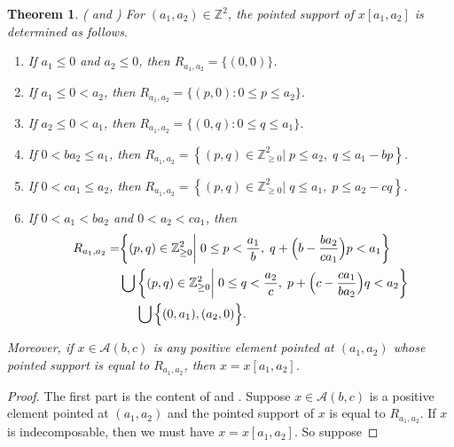 \documentclass[11pt]{amsart}
\newtheorem{theorem}{Theorem}[section]
\theoremstyle{remark}
\numberwithin{equation}{section}
\newcommand{\ZZ}{\mathbb{Z}}
\newcommand{\cA}{\mathcal{A}}
\begin{document}
\begin{theorem}\label{th:pointed supports}(\cite[Proposition~4.1]{LLZ} and \cite[Corollary 3.5]{LLZ2})
  For $(a_1,a_2)\in\ZZ^2$, the pointed support of $x[a_1,a_2]$ is determined as follows.
\begin{enumerate}
  \item If $a_1 \leq 0$ and $a_2 \leq 0$, then $R_{a_1,a_2} = \{(0,0)\}$.
  \item If $a_1 \leq 0 < a_2$, then $R_{a_1,a_2} = \{(p,0): 0 \leq p \leq a_2\}$.
  \item If $a_2 \leq 0 < a_1$, then $R_{a_1,a_2} = \{(0,q): 0 \leq q \leq a_1\}$.
  \item If $0<ba_2\leq a_1$, then $R_{a_1,a_2}=\left\{(p,q)\in\ZZ_{\ge0}^2\big|\; p\le a_{2},\; q\le a_{1}-bp\right\}$.
  \item If $0<ca_1\leq a_2$, then $R_{a_1,a_2}=\left\{(p,q)\in\ZZ_{\ge0}^2\big|\; q\le a_{1},\; p\le a_{2}-cq\right\}$.
  \item If $0 < a_1 < ba_2$ and $0 < a_2 < ca_1$, then
  $$\aligned
  R_{a_1,a_2}=&\bigg\{(p,q)\in\ZZ_{\ge0}^2\bigg|\; 0\le p< \frac{a_1}{b},\; q+\Big(b-\frac{ba_2}{ca_1}\Big)p<a_1\bigg\}\\
  &\bigcup\bigg\{(p,q)\in\ZZ_{\ge0}^2\bigg|\; 0\le q<
    \frac{a_2}{c},\; p+\Big(c-\frac{ca_1}{ba_2}\Big)q<a_2\bigg\}\\
  &\hspace{1.35em}\bigcup\Big\{(0,a_1),(a_2,0)\Big\}.
  \endaligned
  $$
\end{enumerate}
Moreover, if $x\in\cA(b,c)$ is any positive element pointed at $(a_1,a_2)$ whose pointed support is equal to $R_{a_1,a_2}$, then $x=x[a_1,a_2]$. 
\end{theorem}
\begin{proof}
 The first part is the content of \cite[Proposition~4.1]{LLZ} and \cite[Corollary 3.5]{LLZ2}.  Suppose $x\in\cA(b,c)$ is a positive element pointed at $(a_1,a_2)$ and the pointed support of $x$ is equal to $R_{a_1,a_2}$.  If $x$ is indecomposable, then we must have $x=x[a_1,a_2]$.  So suppose 
\end{proof}
\end{document}

